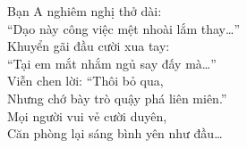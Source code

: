 \documentclass[../main.tex]{subfiles}
\begin{document}
\begin{center}
    \il

    Bạn A nghiêm nghị thở dài:\\
    ``Dạo này công việc mệt nhoài lắm thay\dots''\\
    Khuyển gãi đầu cười xua tay:\\
    ``Tại em mắt nhắm ngủ say đấy mà\dots''\\
    Viễn chen lời: ``Thôi bỏ qua,\\
    Nhưng chớ bày trò quậy phá liên miên.''\\
    Mọi người vui vẻ cười duyên,\\
    Căn phòng lại sáng bình yên như đầu\dots\\
\end{center}
\end{document}
